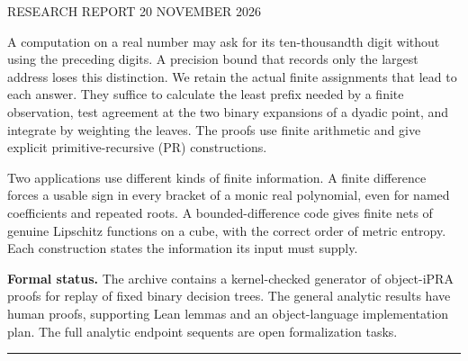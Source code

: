 \documentclass[11pt,letterpaper]{article}
\theoremstyle{definition}\newtheorem{definition}[theorem]{Definition}
\begin{document}
\thispagestyle{plain}
{\color{accent}\sffamily\small RESEARCH REPORT \hfill 20 NOVEMBER 2026}\par
{}\par
\vspace{5pt}{\Large Primitive-recursive moduli, integration and root finding}\par
\vspace{13pt}
\noindent A computation on a real number may ask for its ten-thousandth digit without using the preceding digits. A precision bound that records only the largest address loses this distinction. We retain the actual finite assignments that lead to each answer. They suffice to calculate the least prefix needed by a finite observation, test agreement at the two binary expansions of a dyadic point, and integrate by weighting the leaves. The proofs use finite arithmetic and give explicit primitive-recursive (PR) constructions.\par
\medskip
\noindent Two applications use different kinds of finite information. A finite difference forces a usable sign in every bracket of a monic real polynomial, even for named coefficients and repeated roots. A bounded-difference code gives finite nets of genuine Lipschitz functions on a cube, with the correct order of metric entropy. Each construction states the information its input must supply.\par
\medskip
\noindent\textbf{Formal status.} The archive contains a kernel-checked generator of object-iPRA proofs for replay of fixed binary decision trees. The general analytic results have human proofs, supporting Lean lemmas and an object-language implementation plan. The full analytic endpoint sequents are open formalization tasks.\par
\medskip\hrule\smallskip
\tableofcontents
\clearpage






\end{document}
